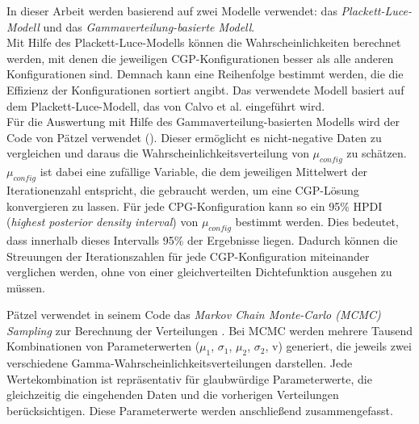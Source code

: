 In dieser Arbeit werden basierend auf \cite{cui_equidistant_2023} zwei Modelle verwendet: das \emph{Plackett-Luce-Modell} und das \emph{Gammaverteilung-basierte Modell}.\\
Mit Hilfe des Plackett-Luce-Modells können die Wahrscheinlichkeiten berechnet werden, mit denen die jeweiligen CGP-Konfigurationen besser als alle anderen Konfigurationen sind.
Demnach kann eine Reihenfolge bestimmt werden, die die Effizienz der Konfigurationen sortiert angibt.
Das verwendete Modell basiert auf dem Plackett-Luce-Modell, das von Calvo et al. eingeführt wird. \cite{cui_equidistant_2023, calvo_plackett_luce}\\
Für die Auswertung mit Hilfe des Gammaverteilung-basierten Modells wird der Code von Pätzel verwendet (\cite{patzel_dpaetzelcmpbayes_2024}). 
Dieser ermöglicht es nicht-negative Daten zu vergleichen und daraus die Wahrscheinlichkeitsverteilung von $\mu_{config}$ zu schätzen.
$\mu_{config}$ ist dabei eine zufällige Variable, die dem jeweiligen Mittelwert der Iterationenzahl entspricht, die gebraucht werden, um eine CGP-Lösung konvergieren zu lassen.
Für jede CPG-Konfiguration kann so ein 95\% HPDI (\emph{highest posterior density interval}) von $\mu_{config}$ bestimmt werden.
Dies bedeutet, dass innerhalb dieses Intervalls 95\% der Ergebnisse liegen. \cite{cui_equidistant_2023}
Dadurch können die Streuungen der Iterationszahlen für jede CGP-Konfiguration miteinander verglichen werden, ohne von einer gleichverteilten Dichtefunktion ausgehen zu müssen.

Pätzel verwendet in seinem Code das \emph{Markov Chain Monte-Carlo (MCMC) Sampling} zur Berechnung der Verteilungen \cite{patzel_dpaetzelcmpbayes_2024, cui_equidistant_2023}.
Bei MCMC werden mehrere Tausend Kombinationen von Parameterwerten ($\mu_1$, $\sigma_1$, $\mu_2$, $\sigma_2$, v) generiert, die jeweils zwei verschiedene Gamma-Wahrscheinlichkeitsverteilungen darstellen.
Jede Wertekombination ist repräsentativ für glaubwürdige Parameterwerte, die gleichzeitig die eingehenden Daten und die vorherigen Verteilungen berücksichtigen.
Diese Parameterwerte werden anschließend zusammengefasst. \cite{kruschke_bayesian_estimation}

